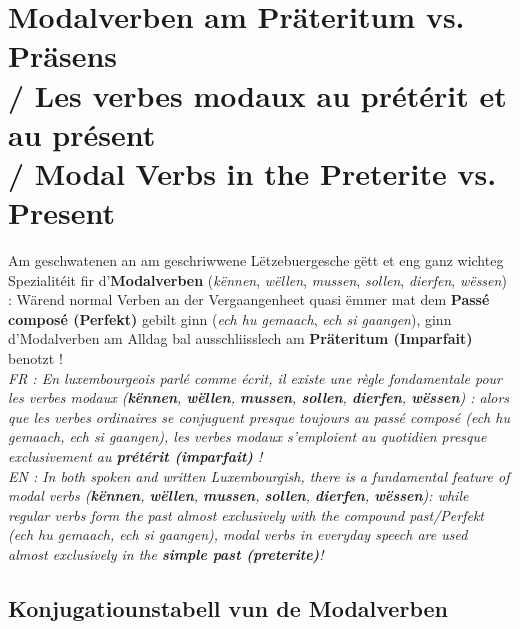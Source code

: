 \section[Modalverben am Präteritum vs. Präsens / Modal Verbs in Past and Present]{Modalverben am Präteritum vs. Präsens \\/ Les verbes modaux au prétérit et au présent \\/ Modal Verbs in the Preterite vs. Present}

Am geschwatenen an am geschriwwene Lëtzebuergesche gëtt et eng ganz wichteg Spezialitéit fir d'\textbf{Modalverben} (\textit{kënnen}, \textit{wëllen}, \textit{mussen}, \textit{sollen}, \textit{dierfen}, \textit{wëssen}) :
Wärend normal Verben an der Vergaangenheet quasi ëmmer mat dem \textbf{Passé composé (Perfekt)} gebilt ginn (\textit{ech hu gemaach}, \textit{ech si gaangen}), ginn d'Modalverben am Alldag bal ausschliisslech am \textbf{Präteritum (Imparfait)} benotzt ! \\
\textit{FR : En luxembourgeois parlé comme écrit, il existe une règle fondamentale pour les verbes modaux (\textbf{kënnen}, \textbf{wëllen}, \textbf{mussen}, \textbf{sollen}, \textbf{dierfen}, \textbf{wëssen}) : alors que les verbes ordinaires se conjuguent presque toujours au passé composé (\textit{ech hu gemaach}, \textit{ech si gaangen}), les verbes modaux s'emploient au quotidien presque exclusivement au \textbf{prétérit (imparfait)} !} \\
\textit{EN : In both spoken and written Luxembourgish, there is a fundamental feature of modal verbs (\textbf{kënnen}, \textbf{wëllen}, \textbf{mussen}, \textbf{sollen}, \textbf{dierfen}, \textbf{wëssen}): while regular verbs form the past almost exclusively with the compound past/Perfekt (\textit{ech hu gemaach}, \textit{ech si gaangen}), modal verbs in everyday speech are used almost exclusively in the \textbf{simple past (preterite)}!}

\subsection{Konjugatiounstabell vun de Modalverben}


